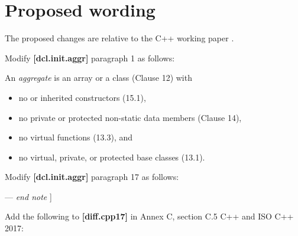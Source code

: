 \section{Proposed wording}

The proposed changes are relative to the C++ working paper \cite{Smith2018}. 

\vspace{5mm}
Modify \textbf{[dcl.init.aggr]} paragraph 1 as follows:

\begin{adjustwidth}{1cm}{1cm}
An \textit{aggregate} is an array or a class (Clause 12) with
\begin{itemize}
\item
no  or inherited constructors (15.1),
\item
no private or protected non-static data members (Clause 14),
\item
no virtual functions (13.3), and
\item
no virtual, private, or protected base classes (13.1).
\end{itemize}
\end{adjustwidth}

\vspace{5mm}
Modify \textbf{[dcl.init.aggr]} paragraph 17 as follows:

\begin{adjustwidth}{1cm}{1cm}
 --- \emph{end note} ]
\end{adjustwidth}

\vspace{5mm}
Add the following to \textbf{[diff.cpp17]} in Annex C, section C.5 C++ and ISO C++ 2017:

